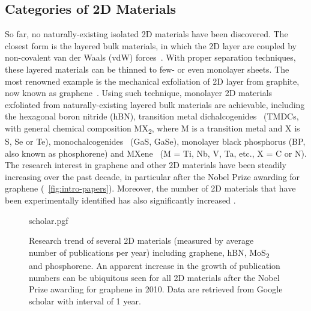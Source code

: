

\subsection{Categories of 2D Materials}
\label{sec:categ-2d-mater}

So far, no naturally-existing isolated 2D
materials have been discovered.
%
The closest form is the layered bulk materials, in which the 2D layer
are coupled by non-covalent van der Waals (vdW)
forces~\autocite{Israelachvili_2011_book}.
%
With proper separation techniques, these layered materials can be
thinned to few- or even mono\-layer sheets.
%
The most renowned example is the mechanical exfoliation of 2D layer from graphite,
now known as graphene~\autocite{Novoselov_2004_gr}.
%
Using such technique, mono\-layer 2D materials exfoliated from naturally-existing
layered bulk materials are achievable, including the hexagonal boron
nitride\autocite{Cavar_2008_hBN_Pt,Gorbachev_2011_BN_monolayer} (hBN), transition metal
dichalcogenides~\autocite{Mak_2010_mos2} (TMDCs, with general chemical
composition MX\textsubscript{2}, where M is a transition metal and X
is S, Se or Te), monochalcogenides~\autocite{Late_2012_GaS} (GaS, GaSe),
monolayer black phosphorus\autocite{Li_2014_BP,Liu_2014_BP} (BP, also
known as phosphorene) and MXene~\autocite{Naguib_2011_Mxene} (M = Ti, Nb,
V, Ta, etc., X = C or N).
%
The research interest in graphene and other 2D materials have been
steadily increasing over the past decade, in particular after the
Nobel Prize awarding for graphene (~\autoref{fig:intro-papers}).
%
Moreover, the number of 2D materials that have been experimentally
identified has also significantly increased
\autocite{Bhimanapati_2015_2D_rev,Mannix_2017}.

\begin{figure}[!htbp]
  \centering
  {scholar.pgf}
  \caption{\label{fig:intro-papers} %
    Research trend of several 2D materials (measured by average number
    of publications per year) including graphene, hBN,
    MoS\textsubscript{2} and phosphorene.  An apparent increase in the
    growth of publication numbers can be ubiquitous seen for all 2D
    materials after the Nobel Prize awarding for graphene in
    2010. Data are retrieved from Google scholar with interval of 1
    year. }
\end{figure}

